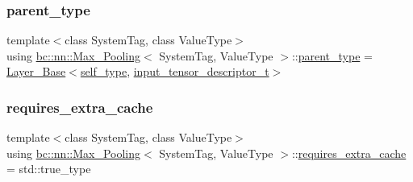 \mbox{\label{structbc_1_1nn_1_1Max__Pooling_aaa69267c6421bc73dea542fdf6617cf0}} 
\subsubsection{\texorpdfstring{parent\+\_\+type}{parent\_type}}
{\footnotesize\ttfamily template$<$class System\+Tag, class Value\+Type$>$ \\
using \hyperlink{structbc_1_1nn_1_1Max__Pooling}{bc\+::nn\+::\+Max\+\_\+\+Pooling}$<$ System\+Tag, Value\+Type $>$\+::\hyperlink{structbc_1_1nn_1_1Max__Pooling_aaa69267c6421bc73dea542fdf6617cf0}{parent\+\_\+type} =  \hyperlink{structbc_1_1nn_1_1Layer__Base}{Layer\+\_\+\+Base}$<$\hyperlink{structbc_1_1nn_1_1Max__Pooling_a4cec43dcbb377793bea061155fbbca52}{self\+\_\+type}, \hyperlink{structbc_1_1nn_1_1Max__Pooling_aea291f6353c358b1f851b83f0787d782}{input\+\_\+tensor\+\_\+descriptor\+\_\+t}$>$}

\mbox{\label{structbc_1_1nn_1_1Max__Pooling_a79b30fd356ececeb223371dbed0fa83e}} 
\subsubsection{\texorpdfstring{requires\+\_\+extra\+\_\+cache}{requires\_extra\_cache}}
{\footnotesize\ttfamily template$<$class System\+Tag, class Value\+Type$>$ \\
using \hyperlink{structbc_1_1nn_1_1Max__Pooling}{bc\+::nn\+::\+Max\+\_\+\+Pooling}$<$ System\+Tag, Value\+Type $>$\+::\hyperlink{structbc_1_1nn_1_1Max__Pooling_a79b30fd356ececeb223371dbed0fa83e}{requires\+\_\+extra\+\_\+cache} =  std\+::true\+\_\+type}

\mbox{\label{structbc_1_1nn_1_1Max__Pooling_a4cec43dcbb377793bea061155fbbca52}} 
